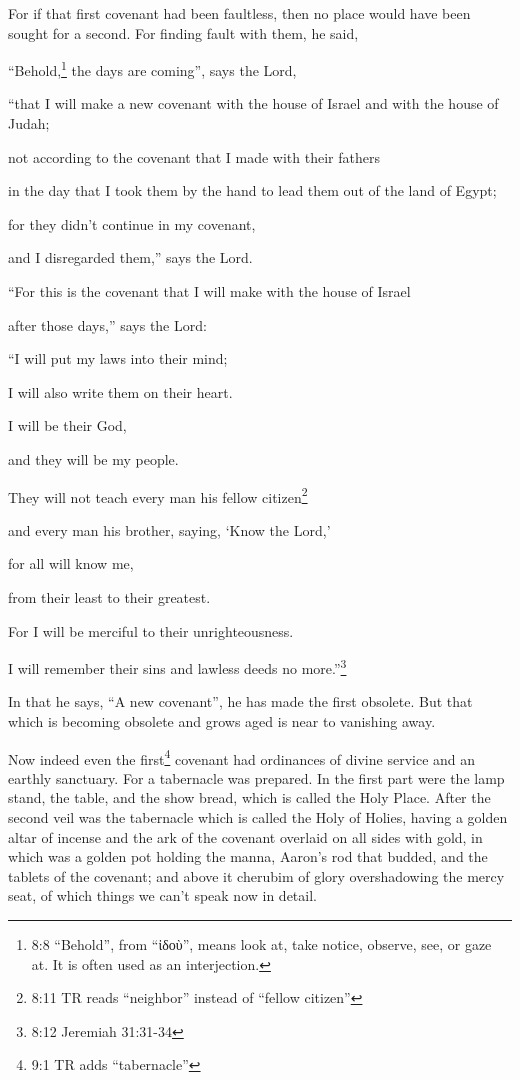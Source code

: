 \myverse{}For if that first covenant had been faultless, then no place would
have been sought for a second.
\myverse{}For finding fault with them, he said,

“Behold,\footnote{8:8 “Behold”, from “ἰδοὺ”, means look at, take notice, observe, see, or gaze at. It is often used
	as an interjection.} the days are coming”, says the Lord,

“that I will make a new covenant with the house of Israel and with the house of
Judah;

\myverse{}not according to the covenant that I made with their fathers

in the day that I took them by the hand to lead them out of the land of Egypt;

for they didn’t continue in my covenant,

and I disregarded them,” says the Lord.

\myverse{}“For this is the covenant that I will make with the house of
Israel

after those days,” says the Lord:

“I will put my laws into their mind;

I will also write them on their heart.

I will be their God,

and they will be my people.

\myverse{}They will not teach every man his fellow citizen\footnote{8:11 TR reads “neighbor” instead of “fellow citizen”}

and every man his brother, saying, ‘Know the Lord,’

for all will know me,

from their least to their greatest.

\myverse{}For I will be merciful to their unrighteousness.

I will remember their sins and lawless deeds no more.”\footnote{8:12 Jeremiah 31:31-34}

\myverse{}In that he says, “A new covenant”, he has made the first obsolete.
But that which is becoming obsolete and grows aged is near to vanishing away.


\mychapter{} \myverse*{}Now indeed even the first\footnote{9:1 TR adds “tabernacle”} covenant had ordinances of divine service and an earthly sanctuary.
\myverse{}For a tabernacle was prepared. In the first part were the lamp stand, the table,
and the show bread, which is called the Holy Place.
\myverse{}After the second veil was the tabernacle which is called the Holy of Holies,
\myverse{}having a golden altar of incense and the ark of the covenant overlaid on all
sides with gold, in which was a golden pot holding the manna, Aaron’s rod that budded, and the tablets
of the covenant;
\myverse{}and above it cherubim of glory overshadowing the mercy seat, of which things
we can’t speak now in detail.

